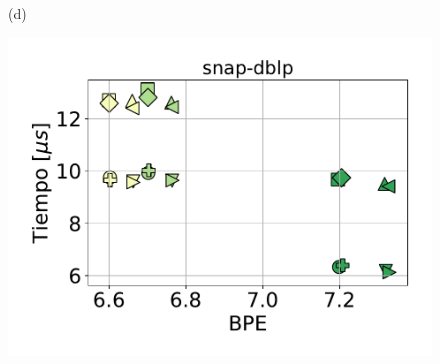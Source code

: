 \begin{figure}
\begin{minipage}{1\textwidth}
\begin{minipage}{0.45\textwidth}
    			(d)
    		\end{minipage}  
    	\end{minipage}
    	
    	\begin{minipage}{1\textwidth}
    		\centering
    		\begin{minipage}{0.45\textwidth}
    			\centering
    			\begin{minipage}{0.75\textwidth}
    				\centering
    				\includegraphics[width=1\linewidth]{img/sdsl/aleatorio/snap-dblp.pdf}
    			\end{minipage}
    			\begin{minipage}{0.2\textwidth}
    				\centering

\end{minipage}
\end{minipage}
\end{minipage}
\end{figure}
